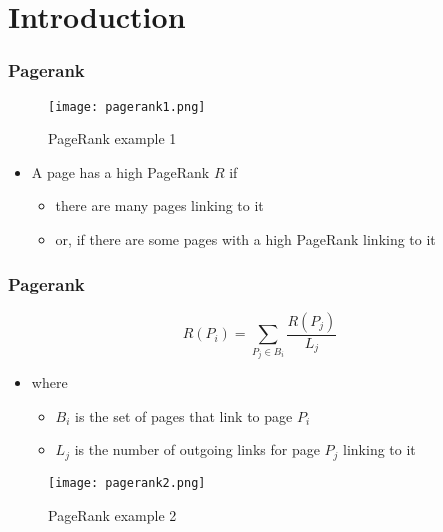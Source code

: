 \section{Introduction}

\begin{frame}
\frametitle{Pagerank}
\begin{figure}
	\centering
	\texttt{[image: pagerank1.png]}
	\caption{PageRank example 1 \cite{prsigner}}
\end{figure}
\begin{itemize}
  \item A page has a high PageRank $R$ if
  \begin{itemize}
    \item there are many pages linking to it
    \item or, if there are some pages with a high PageRank
linking to it
  \end{itemize}
\end{itemize}
\end{frame}

\begin{frame}
\frametitle{Pagerank}

\begin{minipage}[l]{0.5\textwidth}
\textbf{$$ 
R(P_i)= \sum_{P_j \in B_i}\frac{R(P_j)}{L_j}
$$}
\begin{itemize}
  \item where
  \begin{itemize}
    \item $B_i$ is the set of pages that link to page $P_i$
    \item $L_j$ is the number of outgoing links for page $P_j$
linking to it
  \end{itemize}
\end{itemize}
\end{minipage}
\begin{minipage}[l]{0.49\textwidth}
\begin{figure}
	\centering
	\texttt{[image: pagerank2.png]}
	\caption{PageRank example 2 \cite{prsigner}}
\end{figure}
\end{minipage}

\end{frame}

